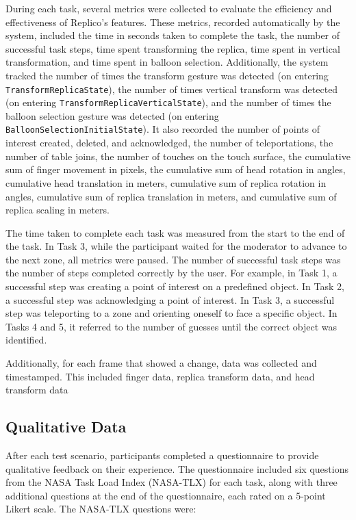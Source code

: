         During each task, several metrics were collected to evaluate the efficiency and effectiveness of Replico's features. These metrics, recorded automatically by the system, included the time in seconds taken to complete the task, the number of successful task steps, time spent transforming the replica, time spent in vertical transformation, and time spent in balloon selection. Additionally, the system tracked the number of times the transform gesture was detected (on entering \lstinline{TransformReplicaState}), the number of times vertical transform was detected (on entering \lstinline{TransformReplicaVerticalState}), and the number of times the balloon selection gesture was detected (on entering \lstinline{BalloonSelectionInitialState}). It also recorded the number of points of interest created, deleted, and acknowledged, the number of teleportations, the number of table joins, the number of touches on the touch surface, the cumulative sum of finger movement in pixels, the cumulative sum of head rotation in angles, cumulative head translation in meters, cumulative sum of replica rotation in angles, cumulative sum of replica translation in meters, and cumulative sum of replica scaling in meters.

        The time taken to complete each task was measured from the start to the end of the task. In Task 3, while the participant waited for the moderator to advance to the next zone, all metrics were paused. The number of successful task steps was the number of steps completed correctly by the user. For example, in Task 1, a successful step was creating a point of interest on a predefined object. In Task 2, a successful step was acknowledging a point of interest. In Task 3, a successful step was teleporting to a zone and orienting oneself to face a specific object. In Tasks 4 and 5, it referred to the number of guesses until the correct object was identified.

        Additionally, for each frame that showed a change, data was collected and timestamped. This included finger data, replica transform data, and head transform data
    
    \subsection{Qualitative Data} \label{sec:qualitative_data}

        After each test scenario, participants completed a questionnaire to provide qualitative feedback on their experience. The questionnaire included six questions from the NASA Task Load Index (NASA-TLX) \cite{hart1988development} for each task, along with three additional questions at the end of the questionnaire, each rated on a 5-point Likert scale. The NASA-TLX questions were:


